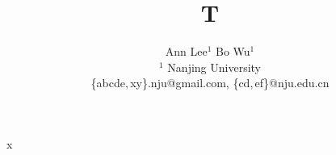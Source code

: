 \documentclass{article}
\title{T}
\author{Ann Lee$^{1}$ \quad Bo Wu$^{1}$ \\ $^1$ Nanjing University \\ \{abcde,\,xy\}.nju@gmail.com, \{cd,\,ef\}@nju.edu.cn}
\begin{document}
\maketitle
x
\end{document}
